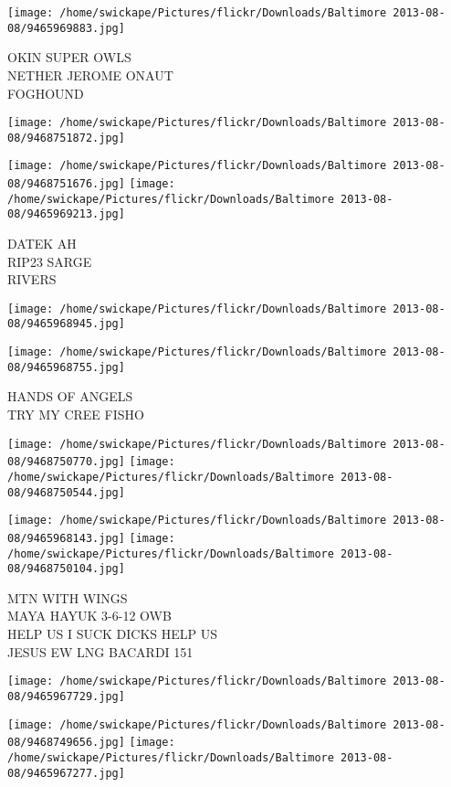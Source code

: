 \documentclass[10pt,letterpaper]{article}
\begin{document}
\texttt{[image: /home/swickape/Pictures/flickr/Downloads/Baltimore 2013-08-08/9465969883.jpg]}

OKIN SUPER OWLS\\
NETHER JEROME ONAUT\\
FOGHOUND\\
\pagebreak

\texttt{[image: /home/swickape/Pictures/flickr/Downloads/Baltimore 2013-08-08/9468751872.jpg]}

\vspace{0.25in}
\texttt{[image: /home/swickape/Pictures/flickr/Downloads/Baltimore 2013-08-08/9468751676.jpg]}
\texttt{[image: /home/swickape/Pictures/flickr/Downloads/Baltimore 2013-08-08/9465969213.jpg]}

DATEK AH\\
RIP23 SARGE\\
RIVERS\\
\pagebreak

\texttt{[image: /home/swickape/Pictures/flickr/Downloads/Baltimore 2013-08-08/9465968945.jpg]}

\vspace{0.25in}
\texttt{[image: /home/swickape/Pictures/flickr/Downloads/Baltimore 2013-08-08/9465968755.jpg]}

HANDS OF ANGELS\\
TRY MY CREE FISHO\\
\pagebreak

\texttt{[image: /home/swickape/Pictures/flickr/Downloads/Baltimore 2013-08-08/9468750770.jpg]}
\texttt{[image: /home/swickape/Pictures/flickr/Downloads/Baltimore 2013-08-08/9468750544.jpg]}

\texttt{[image: /home/swickape/Pictures/flickr/Downloads/Baltimore 2013-08-08/9465968143.jpg]}
\texttt{[image: /home/swickape/Pictures/flickr/Downloads/Baltimore 2013-08-08/9468750104.jpg]}

MTN WITH WINGS\\
MAYA HAYUK 3{-}6{-}12 OWB\\
HELP US I SUCK DICKS HELP US\\
JESUS EW LNG BACARDI 151\\
\pagebreak

\texttt{[image: /home/swickape/Pictures/flickr/Downloads/Baltimore 2013-08-08/9465967729.jpg]}

\vspace{0.25in}
\texttt{[image: /home/swickape/Pictures/flickr/Downloads/Baltimore 2013-08-08/9468749656.jpg]}
\texttt{[image: /home/swickape/Pictures/flickr/Downloads/Baltimore 2013-08-08/9465967277.jpg]}
\end{document}
